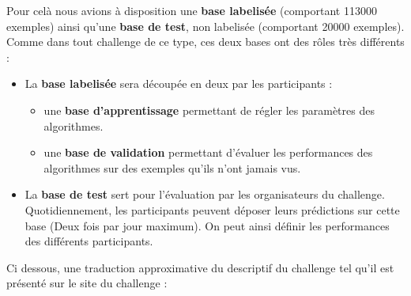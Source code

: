 Pour celà nous avions à disposition une \textbf{base labelisée} (comportant 113000 exemples) ainsi qu'une \textbf{base de test}, non labelisée (comportant 20000 exemples). Comme dans tout challenge de ce type, ces deux bases ont des rôles
très différents :

\begin{itemize}
  \item La \textbf{base labelisée} sera découpée en deux par les participants :
    \begin{itemize}
      \item une \textbf{base d'apprentissage} permettant de régler les
      paramètres des algorithmes.
      \item une \textbf{base de validation} permettant d'évaluer les
      performances des algorithmes sur des exemples qu'ils n'ont jamais vus.
    \end{itemize}
  \item La \textbf{base de test} sert pour l'évaluation par les organisateurs du
  challenge. Quotidiennement, les participants peuvent déposer leurs prédictions
  sur cette base (Deux fois par jour maximum). On peut ainsi définir les
  performances des différents participants.
\end{itemize}

Ci dessous, une traduction approximative du descriptif du challenge tel qu'il
est présenté sur le site du challenge :

